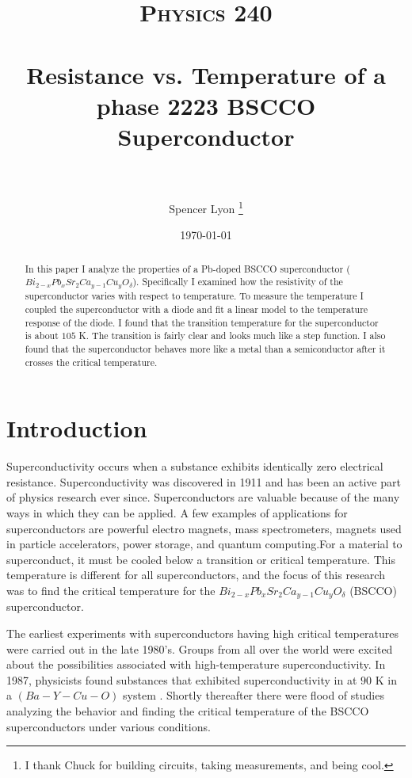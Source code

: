 \documentclass[paper=a4, fontsize=11pt]{scrartcl}
\title{
    \vspace{-.3in}
    \usefont{OT1}{bch}{b}{n}
    \normalfont \normalsize \textsc{Physics 240} \\ [25pt]
    \horrule{0.5pt} \\[0.4cm]
    \huge Resistance vs. Temperature of a phase 2223 BSCCO Superconductor \\
    \horrule{2pt} \\[0.5cm]
  }
\author{
    Spencer Lyon
    \thanks{I thank Chuck for building circuits, taking measurements, and being cool.}
  }
\date{
  \normalfont \normalsize
  \today \\[-4pt] \normalsize
  }
\numberwithin{equation}{section}
\numberwithin{figure}{section}
\numberwithin{table}{section}
\begin{document}
  \begin{titlepage}
      \pagestyle{empty}
      \maketitle

      \begin{abstract}
            \begin{center}
            \small{
                  In this paper I analyze the properties of a Pb-doped BSCCO superconductor ($Bi_{2-x}Pb_xSr_2Ca_{y-1}Cu_yO_{\delta}$). Specifically I examined how the resistivity of the superconductor varies with respect to temperature. To measure the temperature I coupled the superconductor with a diode and fit a linear model to the temperature response of the diode. I found that the transition temperature for the superconductor is about $105$ K. The transition is fairly clear and looks much like a step function. I also found that the superconductor behaves more like a metal than a semiconductor after it crosses the critical temperature.
            }
            \end{center}
      \end{abstract}
  \end{titlepage}

  \pagestyle{fancyplain}
  \setcounter{page}{1}

  \section{Introduction}

      Superconductivity occurs when a substance exhibits identically zero electrical resistance. Superconductivity was discovered in 1911 and has been an active part of physics research ever since. Superconductors are valuable because of the many ways in which they can be applied. A few examples of applications for superconductors are powerful electro magnets, mass spectrometers, magnets used in particle accelerators, power storage, and quantum computing.For a material to superconduct, it must be cooled below a transition or critical temperature. This temperature is different for all superconductors, and the focus of this research was to find the critical temperature for the $Bi_{2-x}Pb_xSr_2Ca_{y-1}Cu_yO_{\delta}$ (BSCCO) superconductor.

      The earliest experiments with superconductors having high critical temperatures were carried out in the late 1980's. Groups from all over the world were excited about the possibilities associated with high-temperature superconductivity. In 1987, physicists found substances that exhibited superconductivity in at $90$ K in a $(Ba-Y-Cu-O)$ system \citep{Ashburn:1987}. Shortly thereafter there were flood of studies analyzing the behavior and finding the critical temperature of the BSCCO superconductors under various conditions.
\end{document}
